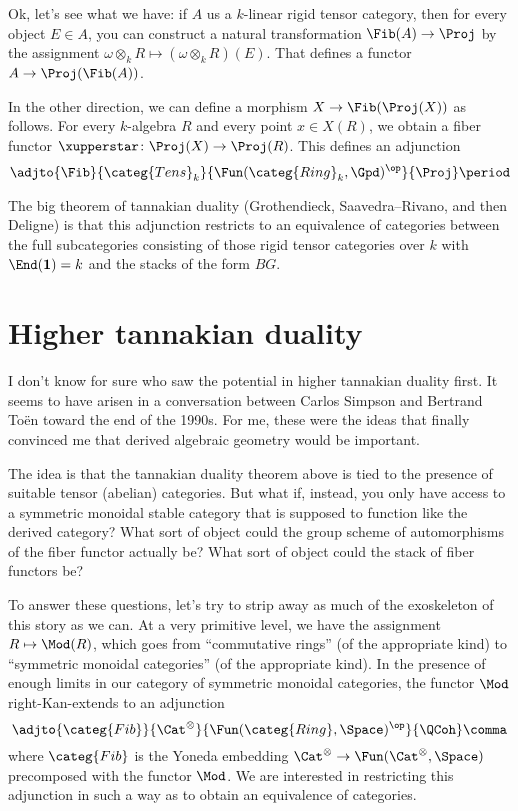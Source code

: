 \documentclass[leqno]{article}
\begin{document}
Ok, let's see what we have:
if \(A\) us a \(k\)-linear rigid tensor category,
then for every object \(E \in A\),
you can construct a natural transformation \(\Fib(A) \to \Proj\)
by the assignment
\(\omega \otimes_k R \mapsto (\omega \otimes_k R)(E)\).
That defines a functor \(A \to \Proj(\Fib(A))\).

In the other direction, we can define a morphism
\(X \to \Fib(\Proj(X))\) as follows.
For every \(k\)-algebra \(R\) and every point \(x \in X(R)\),
we obtain a fiber functor \(\xupperstar \colon \Proj(X) \to \Proj(R)\).
This defines an adjunction
\begin{equation*}
    \adjto{\Fib}{\categ{Tens}_k}
    {\Fun(\categ{Ring}_k,\Gpd)^{\op}}{\Proj} \period
\end{equation*}

The big theorem of tannakian duality
(Grothendieck, Saavedra--Rivano, and then Deligne)
is that this adjunction restricts to an equivalence of categories
between the full subcategories consisting of
those rigid tensor categories over \(k\) with \(\End(\mathbf{1})=k\) and the stacks of the form \(BG\).

\section{Higher tannakian duality}%
\label{highertannakian}

I don't know for sure who saw the potential
in higher tannakian duality first.
It seems to have arisen in a conversation between
Carlos Simpson and Bertrand Toën toward the end of the 1990s.
For me, these were the ideas that finally convinced me that
derived algebraic geometry would be important.

The idea is that the tannakian duality theorem above
is tied to the presence of suitable tensor (abelian) categories.
But what if, instead, you only have access to
a symmetric monoidal stable category that is supposed to function
like the derived category?
What sort of object could the group scheme
of automorphisms of the fiber functor actually be?
What sort of object could the stack of fiber functors be?

To answer these questions, let's try to strip away
as much of the exoskeleton of this story as we can.
At a very primitive level, we have the assignment
\(R \mapsto \Mod(R)\), which goes from \enquote{commutative rings}
(of the appropriate kind)
to \enquote{symmetric monoidal categories}
(of the appropriate kind).
In the presence of enough limits
in our category of symmetric monoidal categories,
the functor \(\Mod\) right-Kan-extends to an adjunction
\begin{equation*}
    \adjto{\categ{Fib}}{\Cat^{\otimes}}
    {\Fun(\categ{Ring},\Space)^{\op}}{\QCoh} \comma
\end{equation*}
where \(\categ{Fib}\) is the Yoneda embedding
\(\Cat^{\otimes} \to \Fun(\Cat^{\otimes},\Space)\)
precomposed with the functor \(\Mod\).
We are interested in restricting this adjunction
in such a way as to obtain an equivalence of categories.
\end{document}
